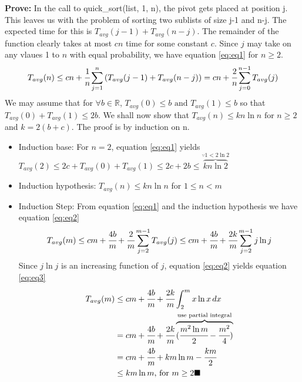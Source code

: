 \documentclass{article}
\begin{document}
\textbf{Prove:} In the call to quick\_sort(list, 1, n), the pivot gets placed at position j. This leaves us with the problem of sorting two sublists of size j-1 and n-j. The expected time for this is $T_{avg}(j-1)+T_{avg}(n-j)$. The remainder of the function clearly takes at most $cn$ time for some constant $c$. Since $j$ may take on any vlaues 1 to $n$ with equal probability, we have equation \ref{eq:eq1} for $n\geq 2$.
\begin{equation}
\label{eq:eq1}
T_{avg}(n)\leq cn + \cfrac{1}{n}\sum\limits_{j=1}^{n}{(T_{avg}(j-1)+T_{avg}(n-j))} = cn+\cfrac{2}{n}\sum\limits_{j=0}^{n-1}{T_{avg}(j)}
\end{equation}
We may assume that for $\forall b \in \mathbb{R}$, $T_{avg}(0)\leq b \text{ and } T_{avg}(1)\leq b$ so that $T_{avg}(0)+T_{avg}(1)\leq 2b$. We shall now show that $T_{avg}(n)\leq kn\ln n \text{ for } n\geq 2$ and $k=2(b+c)$. The proof is by induction on n.
\begin{itemize}
    \item Induction base: For $n=2$, equation \ref{eq:eq1} yields $T_{avg}(2) \leq 2c + T_{avg}(0)+T_{avg}(1) \leq 2c + 2b \leq \overbrace{kn\ln 2}^{\because 1 < 2\ln 2}$
    \item Induction hypothesis: $T_{avg}(n)\leq kn\ln n$ for $1\leq n < m$
    \item Induction Step: From equation \ref{eq:eq1} and the induction hypothesis we have equation \ref{eq:eq2}
    \begin{equation}
    \label{eq:eq2}
        T_{avg}(m) \leq cm + \cfrac{4b}{m}+\cfrac{2}{m}\sum\limits_{j=2}^{m-1}{T_{avg}(j)} \leq cm+\cfrac{4b}{m}+\cfrac{2k}{m}\sum\limits_{j=2}^{m-1}{j\ln j}
    \end{equation}
    Since $j\ln j$ is an increasing function of $j$, equation \ref{eq:eq2} yields equation \ref{eq:eq3}
\begin{equation}
\label{eq:eq3}
\begin{aligned}
    T_{avg}(m) & \leq cm+\cfrac{4b}{m}+\cfrac{2k}{m}\int_{2}^{m} x\ln x \,dx \\
            & = cm+\cfrac{4b}{m}+\cfrac{2k}{m}\overbrace{(\cfrac{m^2\ln m}{2}-\cfrac{m^2}{4})}^\text{use partial integral} \\
            & = cm + \cfrac{4b}{m}+km\ln m - \cfrac{km}{2} \\
            & \leq km\ln {m} \text{, for } m\geq 2 \blacksquare
\end{aligned}
\end{equation}
\end{itemize}
\end{document}

